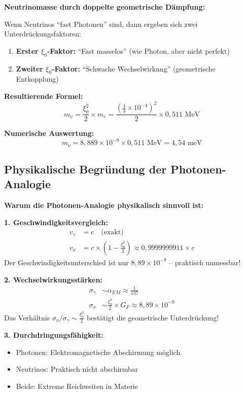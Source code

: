 	\begin{keyresult}
		\textbf{Neutrinomasse durch doppelte geometrische Dämpfung:}
		
		Wenn Neutrinos ``fast Photonen'' sind, dann ergeben sich zwei Unterdrückungsfaktoren:
		
		\begin{enumerate}
			\item \textbf{Erster $\xi_0$-Faktor:} ``Fast masselos'' (wie Photon, aber nicht perfekt)
			\item \textbf{Zweiter $\xi_0$-Faktor:} ``Schwache Wechselwirkung'' (geometrische Entkopplung)
		\end{enumerate}
		
		\textbf{Resultierende Formel:}
		\begin{equation}
			\boxed{m_\nu = \frac{\xi_0^2}{2} \times m_e = \frac{(\frac{4}{3} \times 10^{-4})^2}{2} \times 0,511 \text{ MeV}}
		\end{equation}
		
		\textbf{Numerische Auswertung:}
		\begin{equation}
			m_\nu = 8,889 \times 10^{-9} \times 0,511 \text{ MeV} = 4,54 \text{ meV}
		\end{equation}
	\end{keyresult}
	
	\subsection{Physikalische Begründung der Photonen-Analogie}
	
	\begin{photon}
		\textbf{Warum die Photonen-Analogie physikalisch sinnvoll ist:}
		
		\textbf{1. Geschwindigkeitsvergleich:}
		\begin{align}
			v_\gamma &= c \quad \text{(exakt)} \\
			v_\nu &= c \times \left(1 - \frac{\xi_0^2}{2}\right) \approx 0,9999999911 \times c
		\end{align}
		Der Geschwindigkeitsunterschied ist nur $8,89 \times 10^{-9}$ -- praktisch unmessbar!
		
		\textbf{2. Wechselwirkungsstärken:}
		\begin{align}
			\sigma_\gamma &\sim \alpha_{EM} \approx \frac{1}{137} \\
			\sigma_\nu &\sim \frac{\xi_0^2}{2} \times G_F \approx 8,89 \times 10^{-9}
		\end{align}
		Das Verhältnis $\sigma_\nu/\sigma_\gamma \sim \frac{\xi_0^2}{2}$ bestätigt die geometrische Unterdrückung!
		
		\textbf{3. Durchdringungsfähigkeit:}
		\begin{itemize}
			\item Photonen: Elektromagnetische Abschirmung möglich
			\item Neutrinos: Praktisch nicht abschirmbar
			\item Beide: Extreme Reichweiten in Materie
		\end{itemize}
	\end{photon}
	
